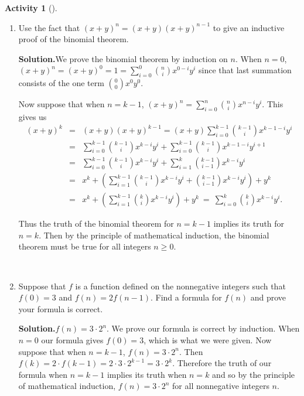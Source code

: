 \documentclass[10pt,]{book}
\theoremstyle{plain}
\theoremstyle{definition}
\newtheorem{activity}[project]{Activity}
\numberwithin{equation}{chapter}
\newcommand{\amp}{&}
\begin{document}
\begin{activity}[]\label{activity-26}
~\par
\begin{enumerate}[label=(\alph*)]
 \item Use the fact that \((x+y)^n = (x+y)(x+y)^{n-1}\) to give an inductive proof of the binomial theorem.%
\par\medskip\noindent%
\textbf{Solution.}\quad We prove the binomial theorem by induction on \(n\). When \(n=0\), \((x+y)^n=(x+y)^0=1=\sum_{i=0}^0 {n\choose i}x^{0-i}y^i\) since that last summation consists of the one term \({0\choose 0}x^0y^0\).%
\par
Now suppose that when \(n=k-1\), \((x+y)^n=\sum_{i=0}^n {n\choose
i}x^{n-i}y^i.\) This gives us%
\begin{align*}
(x+y)^k\amp =\amp (x+y)(x+y)^{k-1}=(x+y)\sum_{i=0}^{k-1}{k-1\choose
i}x^{k-1-i}y^i\\
\amp =\amp \sum_{i=0}^{k-1}{k-1\choose i}x^{k-i}y^i+\sum_{i=0}^{k-1} {k-1\choose
i}x^{k-1-i}y^{i+1}\\
\amp =\amp \sum_{i=0}^{k-1}{k-1\choose i}x^{k-i}y^i+\sum_{i=1}^{k} {k-1\choose
i-1}x^{k-i}y^{i}\\
\amp =\amp  x^k+\left(\sum_{i=1}^{k-1}{k-1\choose i}x^{k-i}y^i+{k-1\choose
i-1}x^{k-i}y^i\right) +y^k\\
\amp =\amp  x^k+\left(\sum_{i=1}^{k-1} {k\choose i}x^{k-i}y^i\right) +y^k\ =\
\sum_{i=0}^k {k\choose i}x^{k-i}y^i.
\end{align*}
%
\par
Thus the truth of the binomial theorem for \(n=k-1\) implies its truth for \(n=k\). Then by the principle of mathematical induction, the binomial theorem must be true for all integers \(n\ge 0\).%

~\par
\item Suppose that \(f\) is a function defined on the nonnegative integers such that \(f(0)=3\) and \(f(n)=2f(n-1)\). Find a formula for \(f(n)\) and prove your formula is correct.%
\par\medskip\noindent%
\textbf{Solution.}\quad \(f(n)=3\cdot2^n\). We prove our formula is correct by induction. When \(n=0\) our formula gives \(f(0)=3\), which is what we were given. Now suppose that when \(n=k-1\), \(f(n) =3\cdot2^n\). Then \(f(k)=2\cdot  f(k-1) =2\cdot 3\cdot2^{k-1}=3\cdot2^k\). Therefore the truth of our formula when \(n=k-1\) implies its truth when \(n=k\) and so by the principle of mathematical induction, \(f(n)=3\cdot 2^n\) for all nonnegative integers \(n\).%

\end{enumerate}
\end{activity}
\typeout{************************************************}
\typeout{************************************************}
\end{document}
